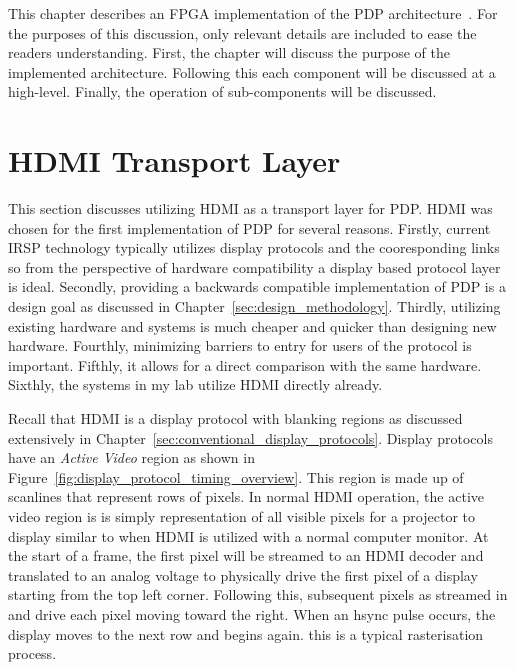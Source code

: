 \label{chap:implementation}

This chapter describes an FPGA implementation of the PDP architecture~\cite{LandwehrEtAl2019_2,JacksonEtAl2019,BrowningEtAl2020}. For the purposes of this discussion, only relevant details are included to ease the readers understanding. First, the chapter will discuss the purpose of the implemented architecture. Following this each component will be discussed at a high-level. Finally, the operation of sub-components will be discussed.

\section{HDMI Transport Layer}
    \label{sec:hdmi_transport_layer}

    This section discusses utilizing HDMI as a transport layer for PDP. HDMI was chosen for the first implementation of PDP for several reasons. Firstly, current IRSP technology typically utilizes display protocols and the cooresponding links so from the perspective of hardware compatibility a display based protocol layer is ideal. Secondly, providing a backwards compatible implementation of PDP is a design goal as discussed in Chapter~\ref{sec:design_methodology}. Thirdly, utilizing existing hardware and systems is much cheaper and quicker than designing new hardware. Fourthly, minimizing barriers to entry for users of the protocol is important. Fifthly, it allows for a direct comparison with the same hardware. Sixthly, the systems in my lab utilize HDMI directly already.

    Recall that HDMI is a display protocol with blanking regions as discussed extensively in Chapter~\ref{sec:conventional_display_protocols}. Display protocols have an {\it Active Video} region as shown in Figure~\ref{fig:display_protocol_timing_overview}. This region is made up of scanlines that represent rows of pixels. In normal HDMI operation, the active video region is is simply representation of all visible pixels for a projector to display similar to when HDMI is utilized with a normal computer monitor. At the start of a frame, the first pixel will be streamed to an HDMI decoder and translated to an analog voltage to physically drive the first pixel of a display starting from the top left corner. Following this, subsequent pixels as streamed in and drive each pixel moving toward the right. When an hsync pulse occurs, the display moves to the next row and begins again. this is a typical rasterisation process.

